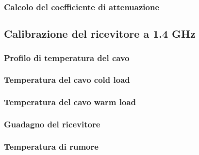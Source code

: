 \subsubsection{Calcolo del coefficiente di attenuazione}


\subsection{Calibrazione del ricevitore a 1.4 GHz}
\subsubsection{Profilo di temperatura del cavo}
\subsubsection{Temperatura del cavo cold load}
\subsubsection{Temperatura del cavo warm load}
\subsubsection{Guadagno del ricevitore}
\subsubsection{Temperatura di rumore}